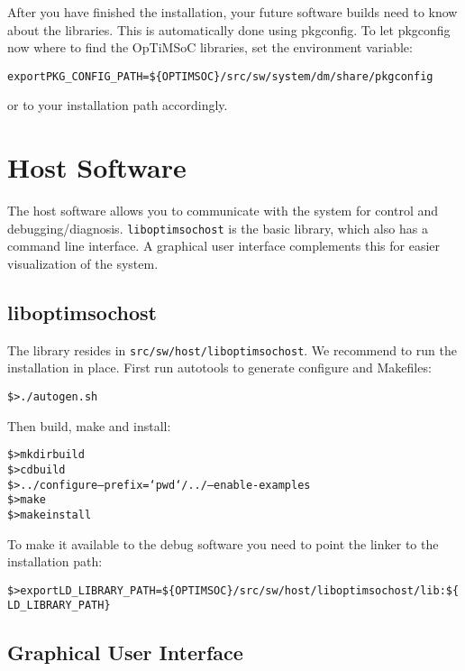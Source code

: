 After you have finished the installation, your future software builds
need to know about the libraries. This is automatically done using
pkgconfig. To let pkgconfig now where to find the OpTiMSoC libraries,
set the environment variable:

\begin{alltt}
export PKG_CONFIG_PATH=\$\{OPTIMSOC\}/src/sw/system/dm/share/pkgconfig
\end{alltt}

or to your installation path accordingly.

\section{Host Software}

The host software allows you to communicate with the system for
control and debugging/diagnosis. \verb|liboptimsochost| is the basic
library, which also has a command line interface. A graphical user
interface complements this for easier visualization of the system.

\subsection{liboptimsochost}

The library resides in \verb|src/sw/host/liboptimsochost|. We
recommend to run the installation in place. First run autotools to
generate configure and Makefiles:

\begin{alltt}
\$> ./autogen.sh
\end{alltt}

Then build, make and install:

\begin{alltt}
\$> mkdir build
\$> cd build
\$> ../configure --prefix=`pwd`/../ --enable-examples
\$> make
\$> make install
\end{alltt}

To make it available to the debug software you need to point the
linker to the installation path:

\begin{alltt}
\$> export LD_LIBRARY_PATH=\$\{OPTIMSOC\}/src/sw/host/liboptimsochost/lib:\$\{LD_LIBRARY_PATH\}
\end{alltt}

\subsection{Graphical User Interface}

